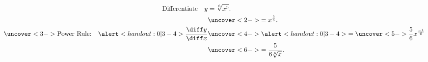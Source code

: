 \begin{frame}
\begin{example}
\abovedisplayskip=0pt
\belowdisplayskip=-15pt
\abovedisplayshortskip=0pt
\belowdisplayshortskip=0pt
\begin{align*}
\text{Differentiate}\quad y & = \sqrt[6]{x^5}.\\%
& \uncover<2->{
 = x^\frac{5}{6}.
} \\
\uncover<3->{%
\text{Power Rule:}\quad %
\alert<handout:0| 3-4>{\frac{\diff y}{\diff x}} %
}%
& \uncover<4->{%
\alert<handout:0| 3-4>{ = \uncover<5->{ \frac{5}{6}x^{\frac{-1}{6}}}}
}\\%
& \uncover<6->{%
 =  \frac{5}{6\sqrt[6]{x}}.%
}%
\end{align*}
\end{example}
\end{frame}
